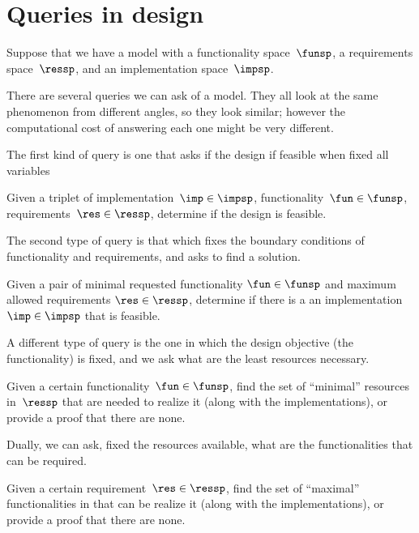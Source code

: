 \section{Queries in design}

Suppose that we have a model with a functionality space~$\funsp$, a requirements space~$\ressp$, and an implementation space~$\impsp$.

There are several queries we can ask of a model. They all look at the same phenomenon from different angles, so they look similar; however the computational cost of answering each one might be very different.

The first kind of query is one that asks if the design if feasible when fixed all variables

\begin{problem}
    Given a triplet of implementation~$\imp\in\impsp$, functionality~$\fun\in\funsp$, requirements~$\res\in\ressp$, determine if the design is feasible.
\end{problem}


The second type of query is that which fixes the boundary conditions of functionality and requirements, and asks to find a solution.

\begin{problem}
    Given a pair of minimal requested functionality $\fun\in\funsp$ and maximum allowed requirements $\res\in\ressp$, determine if there is a an implementation $\imp\in\impsp$ that is feasible.
\end{problem}

A different type of query is the one in which the design objective (the functionality)
is fixed, and we ask what are the least resources necessary.


\begin{problem}[FixFunMinReq]
    Given a certain functionality~$\fun\in\funsp$, find the set of ``minimal'' resources in~$\ressp$ that are needed to realize it (along with the implementations), or provide a proof that there are none.
\end{problem}


Dually, we can ask, fixed the resources available, what are the functionalities that can be required.

\begin{problem}[FixReqMinFun]
    Given a certain requirement~$\res\in\ressp$, find the set of ``maximal'' functionalities in that can be realize it (along with the implementations), or provide a proof that there are none.
\end{problem}


